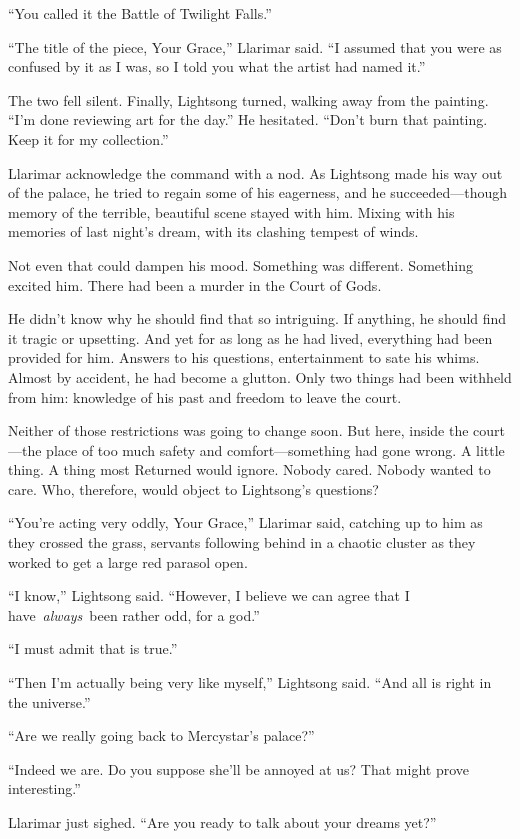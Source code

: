 “You called it the Battle of Twilight Falls.”

“The title of the piece, Your Grace,” Llarimar said. “I assumed that you were as confused by it as I was, so I told you what the artist had named it.”

The two fell silent. Finally, Lightsong turned, walking away from the painting. “I’m done reviewing art for the day.” He hesitated. “Don’t burn that painting. Keep it for my collection.”

Llarimar acknowledge the command with a nod. As Lightsong made his way out of the palace, he tried to regain some of his eagerness, and he succeeded—though memory of the terrible, beautiful scene stayed with him. Mixing with his memories of last night’s dream, with its clashing tempest of winds.

Not even that could dampen his mood. Something was different. Something excited him. There had been a murder in the Court of Gods.

He didn’t know why he should find that so intriguing. If anything, he should find it tragic or upsetting. And yet for as long as he had lived, everything had been provided for him. Answers to his questions, entertainment to sate his whims. Almost by accident, he had become a glutton. Only two things had been withheld from him: knowledge of his past and freedom to leave the court.

Neither of those restrictions was going to change soon. But here, inside the court—the place of too much safety and comfort—something had gone wrong. A little thing. A thing most Returned would ignore. Nobody cared. Nobody wanted to care. Who, therefore, would object to Lightsong’s questions?

“You’re acting very oddly, Your Grace,” Llarimar said, catching up to him as they crossed the grass, servants following behind in a chaotic cluster as they worked to get a large red parasol open.

“I know,” Lightsong said. “However, I believe we can agree that I have~\textit{always}~been rather odd, for a god.”

“I must admit that is true.”

“Then I’m actually being very like myself,” Lightsong said. “And all is right in the universe.”

“Are we really going back to Mercystar’s palace?”

“Indeed we are. Do you suppose she’ll be annoyed at us? That might prove interesting.”

Llarimar just sighed. “Are you ready to talk about your dreams yet?”

